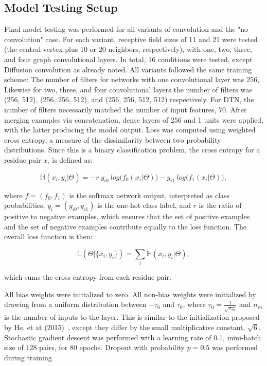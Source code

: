 \subsection{Model Testing Setup}

Final model testing was performed for all variants of convolution and the "no convolution" case.
For each variant, receptive field sizes of 11 and 21 were tested (the central vertex plus 10 or 20 neighbors, respectively), with one, two, three, and four graph convolutional layers. 
In total, 16 conditions were tested, except Diffusion convolution as already noted.
All variants followed the same training scheme:
The number of filters for networks with one convolutional layer was 256, Likewise for two, three, and four convolutional layers the number of filters was (256, 512), (256, 256, 512), and (256, 256, 512, 512) respectively.
For DTN, the number of filters necessarily matched the number of input features, 70.
After merging examples via concatenation, dense layers of 256 and 1 units were applied, with the latter producing the model output.
Loss was computed using weighted cross entropy, a measure of the dissimilarity between two probability distributions.
Since this is a binary classification problem, the cross entropy for a residue pair $x_i$ is defined as: 

\begin{equation}
\mathbb{H}(x_i, y_i | \Theta) = - r ~ y_{i0} ~ log\big(f_0(x_i|\Theta)\big) - y_{i1} ~ log\big(f_1(x_i|\Theta)\big),
\label{eq:weighted_ce}
\end{equation}

\noindent
where $f = (f_0, f_1)$ is the softmax network output, interpreted as class probabilities, $y_i = (y_{i0}, y_{i1})$ is the one-hot class label, and $r$ is the ratio of positive to negative examples, which ensures that the set of positive examples and the set of negative examples contribute equally to the loss function.
The overall loss function is then:

\begin{equation}
\mathbb{L}(\Theta | \{x_i, y_i\}) = \sum_{i} \mathbb{H}(x_i, y_i | \Theta),
\end{equation}

\noindent
which sums the cross entropy from each residue pair.


All bias weights were initialized to zero.
All non-bias weights were initialized by drawing from a uniform distribution between $-\tau_0$ and $\tau_0$, where $\tau_0=\frac{1}{\sqrt{n_{in}}}$ and $n_{in}$ is the number of inputs to the layer.
This is similar to the initialization proposed by He, et at (2015)~\cite{he2015}, except they differ by the small multiplicative constant, $\sqrt{6}$.
Stochastic gradient descent was performed with a learning rate of 0.1, mini-batch size of 128 pairs, for 80 epochs.
Dropout with probability $p=0.5$ was performed during training.

